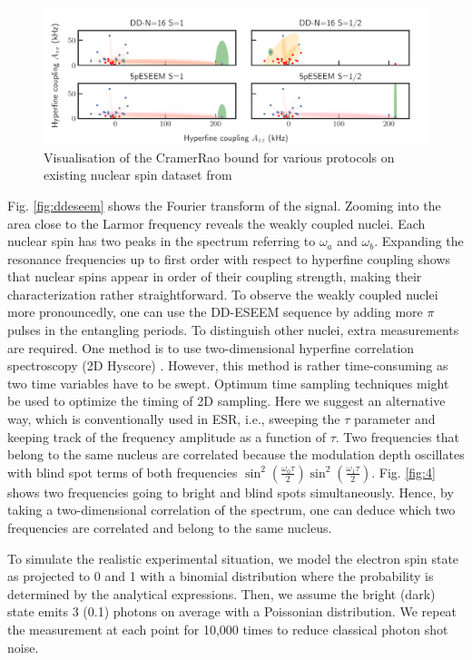 \documentclass[%
 reprint,
superscriptaddress,
 amsmath,amssymb,
 aps,
]{revtex4-2}
\begin{document}
\label{sec:discussion}
\begin{figure}%
	\begin{center}
		\includegraphics[width=1.0\textwidth]{pict/cov_compare_vad.pdf}
		\caption{Visualisation of the CramerRao bound for various protocols on existing nuclear spin dataset from \cite{abobeih2019atomic}}
		\label{fig:cov}
	\end{center}
\end{figure}
Fig. \ref{fig:ddeseem} shows the Fourier transform of the signal.
Zooming into the area close to the Larmor frequency reveals the weakly coupled nuclei.
Each nuclear spin has two peaks in the spectrum referring to $\omega_a$ and $\omega_b$. Expanding the resonance frequencies up to first order with respect to hyperfine coupling shows that nuclear spins appear in order of their coupling strength, making their characterization rather straightforward.
To observe the weakly coupled nuclei more pronouncedly, one can use the DD-ESEEM sequence by adding more $\pi$ pulses in the entangling periods.
To distinguish other nuclei, extra measurements are required.
One method is to use two-dimensional hyperfine correlation spectroscopy (2D Hyscore) \cite{vorobyov2022addressing}.
However, this method is rather time-consuming as two time variables have to be swept.
Optimum time sampling techniques might be used to optimize the timing of 2D sampling.
Here we suggest an alternative way, which is conventionally used in ESR, i.e., sweeping the $\tau$ parameter and keeping track of the frequency amplitude as a function of $\tau$.
Two frequencies that belong to the same nucleus are correlated because the modulation depth oscillates with blind spot terms of both frequencies $\sin^2(\frac{\omega_0 \tau}{2}) \sin^2(\frac{\omega_1 \tau}{2})$.
Fig. \ref{fig:4} shows two frequencies going to bright and blind spots simultaneously.
Hence, by taking a two-dimensional correlation of the spectrum, one can deduce which two frequencies are correlated and belong to the same nucleus.

To simulate the realistic experimental situation, we model the electron spin state as projected to 0 and 1 with a binomial distribution where the probability is determined by the analytical expressions. Then, we assume the bright (dark) state emits 3 (0.1) photons on average with a Poissonian distribution. We repeat the measurement at each point for 10,000 times to reduce classical photon shot noise.
\end{document}
